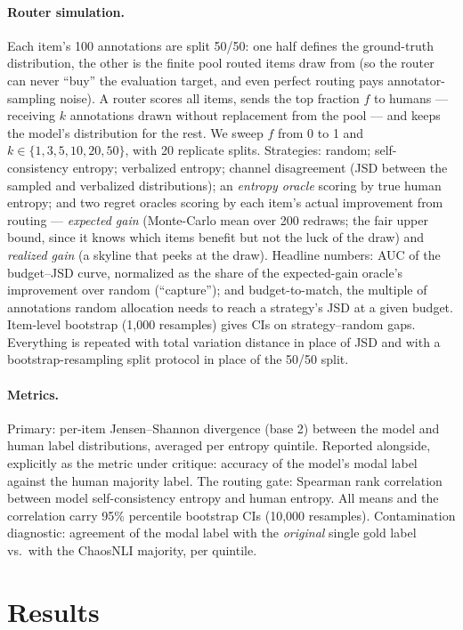 \documentclass[11pt]{article}
\begin{document}
\paragraph{Router simulation.} Each item's 100 annotations are split 50/50: one half defines the ground-truth distribution, the other is the finite pool routed items draw from (so the router can never ``buy'' the evaluation target, and even perfect routing pays annotator-sampling noise). A router scores all items, sends the top fraction $f$ to humans --- receiving $k$ annotations drawn without replacement from the pool --- and keeps the model's distribution for the rest. We sweep $f$ from 0 to 1 and $k \in \{1, 3, 5, 10, 20, 50\}$, with 20 replicate splits. Strategies: random; self-consistency entropy; verbalized entropy; channel disagreement (JSD between the sampled and verbalized distributions); an \emph{entropy oracle} scoring by true human entropy; and two regret oracles scoring by each item's actual improvement from routing --- \emph{expected gain} (Monte-Carlo mean over 200 redraws; the fair upper bound, since it knows which items benefit but not the luck of the draw) and \emph{realized gain} (a skyline that peeks at the draw). Headline numbers: AUC of the budget--JSD curve, normalized as the share of the expected-gain oracle's improvement over random (``capture''); and budget-to-match, the multiple of annotations random allocation needs to reach a strategy's JSD at a given budget. Item-level bootstrap (1,000 resamples) gives CIs on strategy--random gaps. Everything is repeated with total variation distance in place of JSD and with a bootstrap-resampling split protocol in place of the 50/50 split.

\paragraph{Metrics.} Primary: per-item Jensen--Shannon divergence (base 2) between the model and human label distributions, averaged per entropy quintile. Reported alongside, explicitly as the metric under critique: accuracy of the model's modal label against the human majority label. The routing gate: Spearman rank correlation between model self-consistency entropy and human entropy. All means and the correlation carry 95\% percentile bootstrap CIs (10,000 resamples). Contamination diagnostic: agreement of the modal label with the \emph{original} single gold label vs.\ with the ChaosNLI majority, per quintile.

\section{Results}
\label{sec:results}
\end{document}
